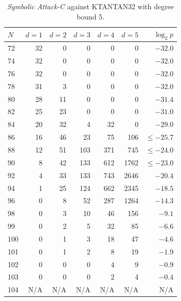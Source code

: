 \begin{table}
\begin{small}
 \begin{center}
\begin{tabular}{|l|r|r|r|r|r|r|}
\hline
$N$ & $d=1$ & $d=2$ & $d=3$ & $d=4$ & $d=5$& $\log_2 p$\\
\hline
 72 &  32 &  0 &   0 &   0 &    0&   ${-32.0}$\\                                                                                                                                         
 74 &  32 &  0 &   0 &   0 &    0&   ${-32.0}$\\                                                                                                                                         
 76 &  32 &  0 &   0 &   0 &    0&   ${-32.0}$\\                                                                                                                                         
 78 &  31 &  3 &   0 &   0 &    0&   ${-32.0}$\\
 80 &  28 & 11 &   0 &   0 &    0&   ${-31.4}$\\
 82 &  25 & 23 &   0 &   0 &    0&   ${-31.0}$\\
 84 &  20 & 32 &   4 &  32 &    0&   ${-29.0}$\\
 86 &  16 & 46 &  23 &  75 &  106&    $\leq -25.7$\\
 88 &  12 & 51 & 103 & 371 &  745&    $\leq -24.0$\\
 90 &   8 & 42 & 133 & 612 & 1762&    $\leq -23.0$\\
 92 &   4 & 33 & 133 & 743 & 2646&   ${-20.4}$\\
 94 &   1 & 25 & 124 & 662 & 2345&   ${-18.5}$\\
 96 &   0 &  8 &  52 & 287 & 1264&   ${-14.3}$\\
 98 &   0 &  3 &  10 &  46 &  156&   ${- 9.1}$\\
 99 &   0 &  2 &   5 &  32 &   85&   ${- 6.6}$\\
100 &   0 &  1 &   3 &  18 &   47&   ${- 4.6}$\\
101 &   0 &  1 &   2 &   8 &   19&   ${- 1.9}$\\
102 &   0 &  0 &   0 &   4 &    9&   ${- 0.9}$\\
103 &   0 &  0 &   0 &   2 &    4&   ${- 0.4}$\\
104 &  N/A& N/A&  N/A&  N/A&  N/A&         N/A\\
\hline                                          
\end{tabular}                             
\end{center}
\end{small}
\caption{\emph{Symbolic Attack-C} against KTANTAN32 with degree bound 5.}
\label{tab:ktantan32-c-5}
\end{table}

